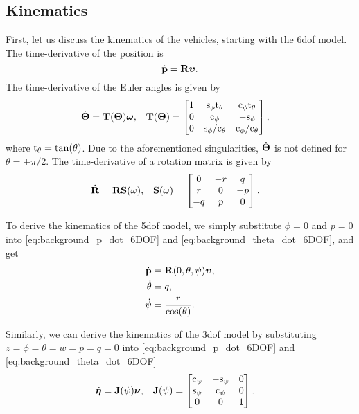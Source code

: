 \subsection{Kinematics}
First, let us discuss the kinematics of the vehicles, starting with the 6\gls{dof} model.
The time-derivative of the position is
\begin{equation}
    \dot{\mathbf{p}} = \mathbf{R} \bm{\upsilon}.
    \label{eq:background_p_dot_6DOF}
\end{equation}
The time-derivative of the Euler angles is given by \cite{fossen_handbook_2011}
\begin{align}
    \dot{\bm{\Theta}} &= \mathbf{T}(\bm{\Theta}) \bm{\omega}, &
    \mathbf{T}(\bm{\Theta}) &= 
    \begin{bmatrix}
        1 & {\rm s}_{\phi}{\rm t}_{\theta} & {\rm c}_{\phi}{\rm t}_{\theta} \\ 0 & {\rm c}_{\phi} & -{\rm s}_{\phi} \\ 0 & {\rm s}_{\phi}/{\rm c}_{\theta} & {\rm c}_{\phi}/{\rm c}_{\theta}
    \end{bmatrix},
    \label{eq:background_theta_dot_6DOF}
\end{align}
where ${\rm t}_{\theta} = \tan(\theta)$.
Due to the aforementioned singularities, $\dot{\bm{\Theta}}$ is not defined for $\theta = \pm \pi/2$.
The time-derivative of a rotation matrix is given by
\begin{align}
    \dot{\mathbf{R}} &= \mathbf{R} \mathbf{S}(\omega), &
    \mathbf{S}(\omega) &=
    \begin{bmatrix}
        0 & -r & q\\ r & 0 & -p\\ -q & p & 0
    \end{bmatrix}.
\end{align}

To derive the kinematics of the 5\gls{dof} model, we simply substitute $\phi = 0$ and $p = 0$ into \eqref{eq:background_p_dot_6DOF} and \eqref{eq:background_theta_dot_6DOF}, and get
\begin{subequations}
    \begin{align}
        \dot{\mathbf{p}} &= \mathbf{R}(0, \theta, \psi) \bm{\upsilon}, \\
        \dot{\theta} &= q, \\
        \dot{\psi} &= \frac{r}{\cos(\theta)}.
    \end{align}
\end{subequations}

Similarly, we can derive the kinematics of the 3\gls{dof} model by substituting $z = \phi = \theta = w = p = q = 0$ into \eqref{eq:background_p_dot_6DOF} and \eqref{eq:background_theta_dot_6DOF}
\begin{align}
    \dot{\bm{\eta}} &= \mathbf{J}(\psi) \bm{\nu}, &
    \mathbf{J}(\psi) &=
    \begin{bmatrix}
        {\rm c}_{\psi} & -{\rm s}_{\psi} & 0 \\
        {\rm s}_{\psi} & {\rm c}_{\psi} & 0 \\
        0 & 0 & 1
    \end{bmatrix}.
\end{align}

